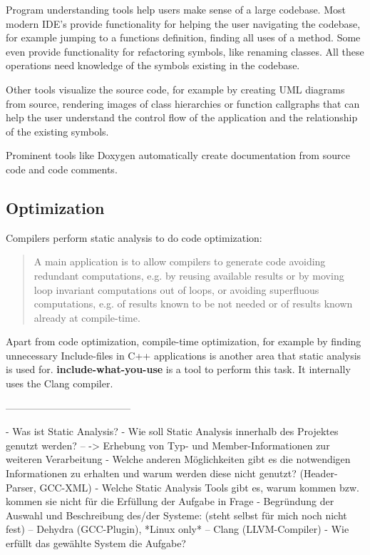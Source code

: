 Program understanding tools help users make sense of a large codebase.  Most modern IDE's provide functionality for helping the user navigating the codebase, for example jumping to a functions definition, finding all uses of a method. Some even provide functionality for refactoring symbols, like renaming classes. All these operations need knowledge of the symbols existing in the codebase.

Other tools visualize the source code, for example by creating UML diagrams from source, rendering images of class hierarchies or function callgraphs that can help the user understand the control flow of the application and the relationship of the existing symbols.


Prominent tools like Doxygen automatically create documentation from source code and code comments.

\subsection{Optimization}

Compilers perform static analysis to do code optimization:

\begin{quotation}
A main application is to allow compilers to generate code avoiding redundant computations, e.g. by reusing available results or by moving loop invariant computations out of loops, or avoiding superfluous computations, e.g. of results known to be not needed or of results known already at compile-time.
\end{quotation}

Apart from code optimization, compile-time optimization, for example by finding unnecessary Include-files in C++ applications is another area that static analysis is used for. \textbf{include-what-you-use} is a tool to perform this task. It internally uses the Clang compiler.


--------------------------------------



 - Was ist Static Analysis?
 - Wie soll Static Analysis innerhalb des Projektes genutzt werden?
 -- -> Erhebung von Typ- und Member-Informationen zur weiteren Verarbeitung
 - Welche anderen Möglichkeiten gibt es die notwendigen Informationen zu erhalten und warum werden diese nicht genutzt? (Header-Parser, GCC-XML)
 - Welche Static Analysis Tools gibt es, warum kommen bzw. kommen sie nicht für die Erfüllung der Aufgabe in Frage
 - Begründung der Auswahl und Beschreibung des/der Systeme: (steht selbst für mich noch nicht fest)
 -- Dehydra (GCC-Plugin), *Linux only*
 -- Clang (LLVM-Compiler)
 - Wie erfüllt das gewählte System die Aufgabe?